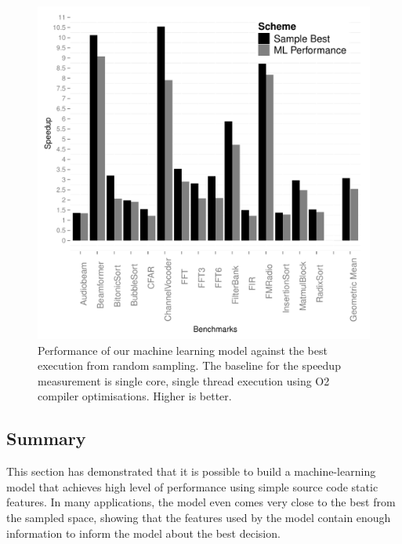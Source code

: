 \begin{figure}
    \centering
    \includegraphics[width=1\textwidth]{streamit-paper/graphics/results.pdf}
    \caption{Performance of our machine learning model against the best execution from random sampling. The baseline for the speedup measurement is single core, single thread execution using O2 compiler optimisations. Higher is better.}\label{fig:results}
\end{figure}

\subsection{Summary}

This section has demonstrated that it is possible to build a machine-learning model that achieves high level of performance using simple source code static features.
In many applications, the model even comes very close to the best from the sampled space, showing that the features used by the model contain enough information to inform the model about the best decision.

\vspace{5mm}
